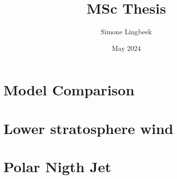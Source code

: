 \documentclass[12pt]{article}
\title{MSc Thesis}
\author{Simone Lingbeek}
\date{May 2024}
\begin{document}
\maketitle

\section{Model Comparison}




\section{Lower stratosphere wind}


\section{Polar Nigth Jet}

\end{document}
